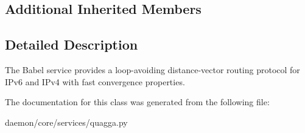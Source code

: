 \subsection*{Additional Inherited Members}


\subsection{Detailed Description}
\begin{DoxyVerb}The Babel service provides a loop-avoiding distance-vector routing 
protocol for IPv6 and IPv4 with fast convergence properties.
\end{DoxyVerb}
 

The documentation for this class was generated from the following file\+:\begin{DoxyCompactItemize}
\item 
daemon/core/services/quagga.\+py\end{DoxyCompactItemize}
